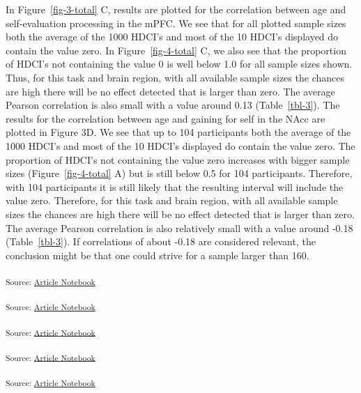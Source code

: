 \documentclass[
  letterpaper,
  DIV=11,
  numbers=noendperiod]{scrartcl}
\begin{document}
In Figure~\ref{fig-3-total} C, results are plotted for the correlation
between age and self-evaluation processing in the mPFC. We see that for
all plotted sample sizes both the average of the 1000 HDCI's and most of
the 10 HDCI's displayed do contain the value zero. In
Figure~\ref{fig-4-total} C, we also see that the proportion of HDCI's
not containing the value 0 is well below 1.0 for all sample sizes shown.
Thus, for this task and brain region, with all available sample sizes
the chances are high there will be no effect detected that is larger
than zero. The average Pearson correlation is also small with a value
around 0.13 (Table~\ref{tbl-3}). The results for the correlation between
age and gaining for self in the NAcc are plotted in Figure 3D. We see
that up to 104 participants both the average of the 1000 HDCI's and most
of the 10 HDCI's displayed do contain the value zero. The proportion of
HDCI's not containing the value zero increases with bigger sample sizes
(Figure~\ref{fig-4-total} A) but is still below 0.5 for 104
participants. Therefore, with 104 participants it is still likely that
the resulting interval will include the value zero. Therefore, for this
task and brain region, with all available sample sizes the chances are
high there will be no effect detected that is larger than zero. The
average Pearson correlation is also relatively small with a value around
-0.18 (Table~\ref{tbl-3}). If correlations of about -0.18 are considered
relevant, the conclusion might be that one could strive for a sample
larger than 160.

\label{cell-fig-3a}
\textsubscript{Source:
\href{https://eduardklap.github.io/sample-size-fmri/sample-size-fmri-paper.qmd.html}{Article
Notebook}}

\label{cell-fig-4a}
\textsubscript{Source:
\href{https://eduardklap.github.io/sample-size-fmri/sample-size-fmri-paper.qmd.html}{Article
Notebook}}

\label{cell-fig-3b}
\textsubscript{Source:
\href{https://eduardklap.github.io/sample-size-fmri/sample-size-fmri-paper.qmd.html}{Article
Notebook}}

\label{cell-fig-4b}
\textsubscript{Source:
\href{https://eduardklap.github.io/sample-size-fmri/sample-size-fmri-paper.qmd.html}{Article
Notebook}}

\label{cell-fig-3c}
\textsubscript{Source:
\href{https://eduardklap.github.io/sample-size-fmri/sample-size-fmri-paper.qmd.html}{Article
Notebook}}
\end{document}

